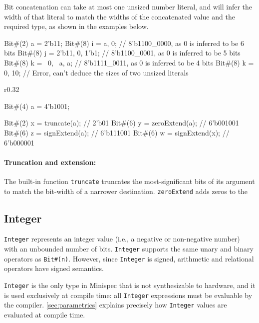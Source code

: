 Bit concatenation can take at most one unsized number literal,
and will infer the width of that literal to match the widths
of the concatenated value and the required type, as shown in the examples below.

\begin{mscode}
Bit#(2) a = 2'b11;
Bit#(8) i = {a, 0};            // 8'b1100_0000, as 0 is inferred to be 6 bits
Bit#(8) j = {2'b11, 0, 1'b1};  // 8'b1100_0001, as 0 is inferred to be 5 bits
Bit#(8) k = {~0, ~a, a};       // 8'b1111_0011, as 0 is inferred to be 4 bits
Bit#(8) k = {0, 10};           // Error, can't deduce the sizes of two unsized literals
\end{mscode}

\begin{wrapfigure}{r}{0.32\columnwidth}
\vspace{-2em}
\begin{mscode}
Bit#(4) a = 4'b1001;

Bit#(2) x = truncate(a);
            // 2'b01
Bit#(6) y = zeroExtend(a);
            // 6'b001001
Bit#(6) z = signExtend(a);
            // 6'b111001
Bit#(6) w = signExtend(x);
            // 6'b000001
\end{mscode}
\vspace{-2.5em}
\end{wrapfigure}

\paragraph{Truncation and extension:}
The built-in function \verb|truncate| truncates the most-significant bits of its argument to match the bit-width of a narrower destination. \verb|zeroExtend| adds zeros to the 

\subsection{Integer}
\label{sec:integer}

\verb|Integer| represents an integer value (i.e., a negative or non-negative number) with an unbounded number of bits.
\verb|Integer| supports the same unary and binary operators as \verb|Bit#(n)|. However, since \verb|Integer| is signed,
arithmetic and relational operators have signed semantics.

\verb|Integer| is the only type in Minispec that is not synthesizable to hardware, and it is used exclusively at compile time:
all \verb|Integer| expressions must be evaluable by the compiler.
\autoref{sec:parametrics} explains precisely how \verb|Integer| values are evaluated at compile time.

